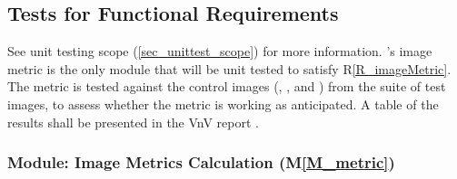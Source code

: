 \documentclass[12pt, titlepage]{article}
\newcommand{\rref}[1]{R\ref{#1}}
\newcommand{\mref}[1]{M\ref{#1}}
\begin{document}
\newpage

\subsection{Tests for Functional Requirements} \label{sec_func_req_unittest}

See unit testing scope (\ref{sec_unittest_scope}) for more information.
\progname{}'s image metric is the only module that will be unit tested to
satisfy \rref{R_imageMetric}. The metric is tested against the control images
(, , and )
from the suite of test images, to assess whether the metric
is working as anticipated.
A table of the results shall be presented in the VnV report \cite{VnV_report}.

\subsubsection{Module: Image Metrics Calculation (\mref{M_metric})}
\end{document}
